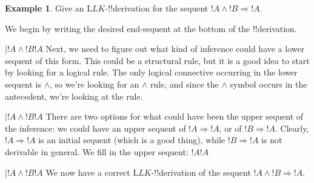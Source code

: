 \documentclass[10pt,a4paper]{article}
\theoremstyle{plain}
\theoremstyle{definition}
\newtheorem{ex}[thm]{Example}
\theoremstyle{remark}
\providecommand{\AxiomC}[1]{}
\providecommand{\RightLabel}[1]{}
\providecommand{\fCenter}{}
\newenvironment{prooftree}{}{}
\providecommand{\Sequent}{\mathrel{\Rightarrow}}
\providecommand{\Log}{\ensuremath{\mathrm{L}}}
\providecommand{\LeftR}[1]{}
\providecommand{\UnaryInf}{\ensuremath{\mid}}
\providecommand{\LeftR}{\mathrm{L}}
\providecommand{\Axiom}{\mathrm{Ax}}
\begin{document}
\begin{ex}
Give an $\Log{LK}$-!!{derivation} for the sequent $!A \land !B \Sequent !A$.

We begin by writing the desired end-sequent at the bottom of the
!!{derivation}.
\begin{prooftree}
\AxiomC{}
\UnaryInf$!A\land !B \fCenter !A$
\end{prooftree}
Next, we need to figure out what kind of inference could have a lower
sequent of this form. This could be a structural rule, but it is a
good idea to start by looking for a logical rule. The only logical
connective occurring in the lower sequent is $\land$,
so we're looking for an $\land$ rule, and since the $\land$ symbol
occurs in the antecedent, we're looking at the \LeftR{\land}
rule.
\begin{prooftree}
\AxiomC{}
\RightLabel{\LeftR{\land}}
\UnaryInf$!A\land !B \fCenter !A$
\end{prooftree}
There are two options for what could have been the upper sequent of
the \LeftR{\land} inference: we could have an upper sequent of $!A
\Sequent !A$, or of $!B \Sequent !A$. Clearly, $!A \Sequent !A$ is an
initial sequent (which is a good thing), while $!B \Sequent !A$ is not
derivable in general. We fill in the upper sequent:
\begin{prooftree}
\Axiom$!A \fCenter !A$
\RightLabel{\LeftR{\land}}
\UnaryInf$!A\land !B \fCenter !A$
\end{prooftree}
We now have a correct $\Log{LK}$-!!{derivation} of the sequent $!A
\land !B \Sequent !A$.
\end{ex}
\end{document}
